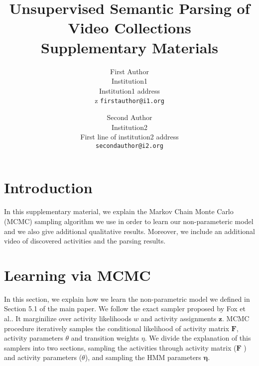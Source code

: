 \documentclass[10pt,twocolumn,letterpaper]{article}
\begin{document}
\title{Unsupervised Semantic Parsing of Video Collections \\ Supplementary Materials}



\author{First Author\\
Institution1\\
Institution1 address\\z
{\tt\small firstauthor@i1.org}
\and
Second Author\\
Institution2\\
First line of institution2 address\\
{\tt\small secondauthor@i2.org}
}

\maketitle

\section{Introduction}
In this supplementary material, we explain the Markov Chain Monte Carlo (MCMC) sampling algorithm we use in order to learn our non-parameteric model and we also give additional qualitative results. Moreover, we include an additional video of discovered activities and the parsing results.

\section{Learning via MCMC}
In this section, we explain how we learn the non-parametric model we defined in Section 5.1 of the main paper. We follow the exact sampler proposed by Fox et al.\cite{foxBPHMM}. It marginilize over activity likelihoods $w$ and activity assignments $\mathbf{z}$. MCMC procedure iteratively samples the conditional likelihood of activity matrix $\mathbf{F}$, activity parameters $\theta$ and transition weights $\eta$. We divide the explanation of this samplers into two sections, sampling the activities through activity matrix ($\mathbf{F}$ ) and activity parameters ($\theta$), and sampling the HMM parameters $\mathbf{\eta}$.
\end{document}
